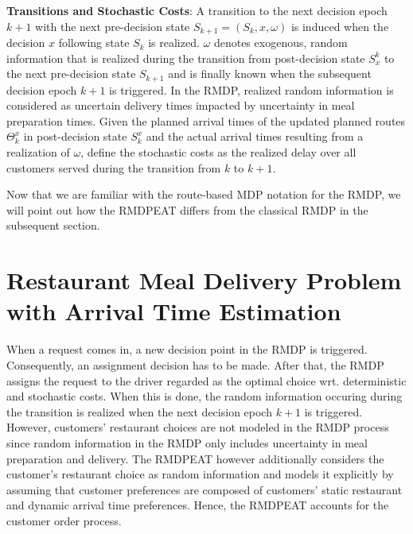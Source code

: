 \begin{description}[font=$\bullet$\scshape\bfseries]
	\item \textbf{Transitions and Stochastic Costs}: A transition to the next decision epoch $ k+1 $  with the next pre-decision state $ S_{k+1} = (S_k, x, \omega) $ is induced when the decision $ x $ following state $ S_k $ is realized. $ \omega $ denotes exogenous, random information that is realized during the transition from post-decision state $ S^{k}_x $ to the next pre-decision state $ S_{k+1} $ and is finally known when the subsequent decision epoch $ k+1 $ is triggered. In the RMDP, realized random information is considered as uncertain delivery times impacted by uncertainty in meal preparation times. Given the planned arrival times of the updated planned routes $ \Theta^{x}_k $ in post-decision state $ S^{x}_k $ and the actual arrival times resulting from a realization of $ \omega $, \cite{UlmerBarrett2017_TWAP} define the stochastic costs as the realized delay over all customers served during the transition from $ k $ to $ k+1 $.
\end{description}

Now that we are familiar with the route-based MDP notation for the RMDP, we will point out how the RMDPEAT differs from the classical RMDP in the subsequent section. 
\section{Restaurant Meal Delivery Problem with Arrival Time Estimation}

When a request comes in, a new decision point in the RMDP is triggered. Consequently, an assignment decision has to be made. After that, the RMDP assigns the request to the driver regarded as the optimal choice wrt. deterministic and stochastic costs. When this is done, the random information occuring during the transition is realized when the next decision epoch $ k+1 $ is triggered. However, customers' restaurant choices are not modeled in the RMDP process since random information in the RMDP only includes uncertainty in meal preparation and delivery. The RMDPEAT however additionally considers the customer's restaurant choice as random information and models it explicitly by assuming that customer preferences are composed of customers' static restaurant and dynamic arrival time preferences. Hence, the RMDPEAT accounts for the customer order process. 

